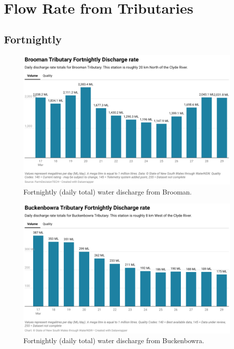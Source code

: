 \documentclass[10pt]{article}
\begin{document}
\section{Flow Rate from Tributaries}
\subsection{Fortnightly}

\begin{figure}[H]
\centering
\includegraphics[width=\textwidth]{fortnightly-brooman.png}
\caption[Fortnightly Discharge From Brooman Tributary]{Fortnightly (daily total) water discharge from Brooman.}
\end{figure}

\begin{figure}[H]
\centering
\includegraphics[width=\textwidth]{fortnightly-buckenbowra.png}
\caption[Fortnightly Discharge Rate Buckenbowra]{Fortnightly (daily total) water discharge from Buckenbowra.}
\end{figure}
\end{document}
